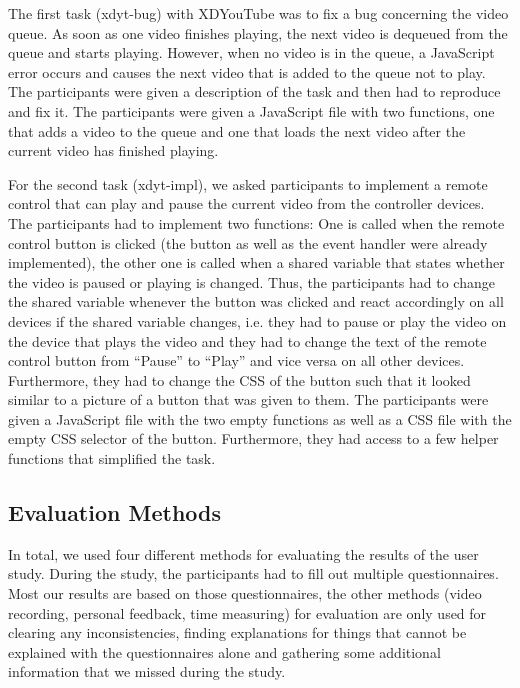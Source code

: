 The first task (xdyt-bug) with XDYouTube was to fix a bug concerning the video queue. As soon as one video finishes playing, the next video is dequeued from the queue and starts playing. However, when no video is in the queue, a JavaScript error occurs and causes the next video that is added to the queue not to play. The participants were given a description of the task and then had to reproduce and fix it.  The participants were given a JavaScript file with two functions, one that adds a video to the queue and one that loads the next video after the current video has finished playing.

For the second task (xdyt-impl), we asked participants to implement a remote control that can play and pause the current video from the controller devices. The participants had to implement two functions: One is called when the remote control button is clicked (the button as well as the event handler were already implemented), the other one is called when a shared variable that states whether the video is paused or playing is changed. Thus, the participants had to change the shared variable whenever the button was clicked and react accordingly on all devices if the shared variable changes, i.e. they had to pause or play the video on the device that plays the video and they had to change the text of the remote control button from ``Pause'' to ``Play'' and vice versa on all other devices. Furthermore, they had to change the CSS of the button such that it looked similar to a picture of a button that was given to them. The participants were given a JavaScript file with the two empty functions as well as a CSS file with the empty CSS selector of the button. Furthermore, they had access to a few helper functions that simplified the task.

\subsection{Evaluation Methods}

In total, we used four different methods for evaluating the results of the user study. During the study, the participants had to fill out multiple questionnaires. Most our results are based on those questionnaires, the other methods (video recording, personal feedback, time measuring) for evaluation are only used for clearing any inconsistencies, finding explanations for things that cannot be explained with the questionnaires alone and gathering some additional information that we missed during the study.

